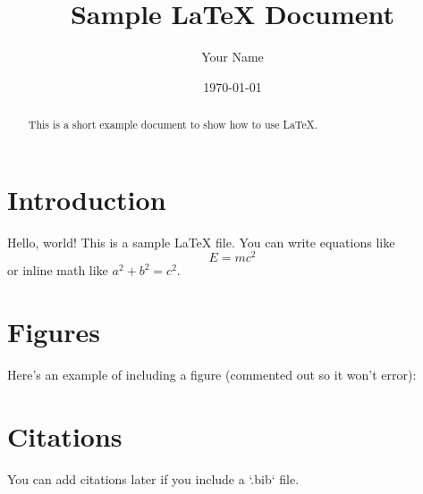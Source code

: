 \documentclass[12pt,a4paper]{article}
\title{Sample LaTeX Document}
\author{Your Name}
\date{\today}
\begin{document}
\maketitle

\begin{abstract}
This is a short example document to show how to use \LaTeX{}.
\end{abstract}

\section{Introduction}
Hello, world! This is a sample \LaTeX{} file.  
You can write equations like
\[
E = mc^2
\]
or inline math like $a^2 + b^2 = c^2$.

\section{Figures}
Here’s an example of including a figure (commented out so it won’t error):


\section{Citations}
You can add citations later if you include a `.bib` file.

% 
% 
\end{document}
